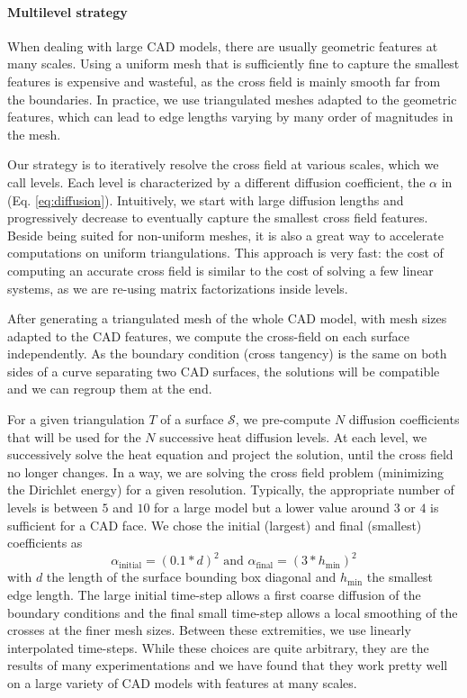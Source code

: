 \documentclass[AMA,STIX1COL]{WileyNJD-v2}
\newcommand{\surface}{\ensuremath{\mathcal{S}}}
\begin{document}
{\paragraph{Multilevel strategy}

When dealing with large CAD models, there are usually geometric features at
many scales. Using a uniform mesh that is sufficiently fine to capture the smallest
features is expensive and wasteful, as the cross field is mainly smooth far
from the boundaries. In practice, we use triangulated meshes adapted to the
geometric features, which can lead to edge lengths varying by many order of
magnitudes in the mesh.

Our strategy is to iteratively resolve the cross field at various scales, which
we call levels. Each level is characterized by a different diffusion
coefficient, the $\alpha$ in (Eq. \ref{eq:diffusion}). Intuitively, we
start with large diffusion lengths and progressively decrease to
eventually capture the smallest cross field features. Beside being
suited for non-uniform meshes, it is also a great way to accelerate
computations on uniform triangulations.  This approach is very fast: the cost
of computing an accurate cross field is similar to the cost of solving a few
linear systems, as we are re-using matrix factorizations inside levels.

After generating a triangulated mesh of the whole CAD model, with
mesh sizes adapted to the CAD features, we compute the cross-field 
on each surface independently. As the boundary condition (cross tangency)
is the same on both sides of a curve separating two CAD surfaces, the
solutions will be compatible and we can regroup them at the end.

For a given triangulation $T$ of a surface $\surface$, we pre-compute $N$ diffusion
coefficients that will be used for the $N$ successive heat diffusion levels. At
each level, we successively solve the heat equation and project the solution,
until the cross field no longer changes. In a way, we are solving the cross
field problem (minimizing the Dirichlet energy) for a given resolution.
Typically, the appropriate number of levels is between $5$ and $10$ for
a large model but a lower value around $3$ or $4$ is sufficient for a CAD face.
We chose the initial (largest) and final (smallest)
coefficients as
$$\alpha_\text{initial} = (0.1 * d)^2 \text{ and } \alpha_\text{final} = (3 * h_\text{min})^2$$
with $d$ the length of the surface bounding box diagonal and
$h_\text{min}$ the smallest edge length. The large initial time-step
allows a first coarse diffusion of the boundary conditions and the final small
time-step allows a local smoothing of the crosses at the finer mesh sizes.
Between these extremities, we use linearly interpolated time-steps. While these
choices are quite arbitrary, they are the results of many experimentations and
we have found that they work pretty well on a large variety of CAD models with
features at many scales.

}
\end{document}
